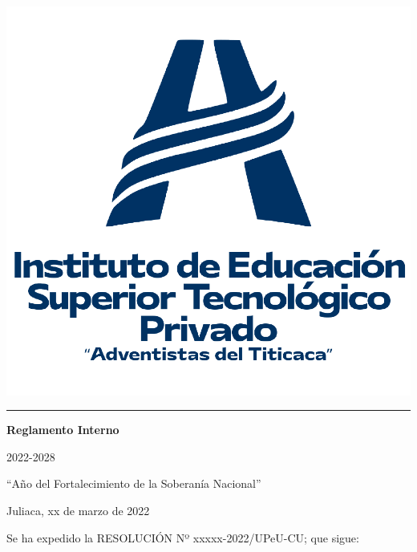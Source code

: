 \documentclass[xcolor=table,12pt, a4paper]{article}
\newcommand{\nombredocumento}{Reglamento Interno}
\newcommand{\periodo}{2022-2028}
\begin{document}
%
%

\begin{titlepage}

\vspace*{4cm}
 
  {\centering
  	\includegraphics[width=.5\textwidth]{imagenes/ISTAT-Portada.png} \\
  }
  {\color{gris}\hrule}
  \vspace*{1cm}
\begin{center}
   {\fontsize{20}{28}\selectfont\bfseries \nombredocumento}
  \hfill
  
  \Large{\periodo}
\end{center}

  \vfill
\end{titlepage}
%
\newpage
\begin{center}
\small
“Año del Fortalecimiento de la Soberanía Nacional”
\end{center}

\begin{flushright}
\small
Juliaca, xx de marzo de 2022
\end{flushright}

\begin{flushleft}
\small
Se ha expedido la RESOLUCIÓN Nº xxxxx-2022/UPeU-CU; que sigue:
\end{flushleft}
\end{document}
